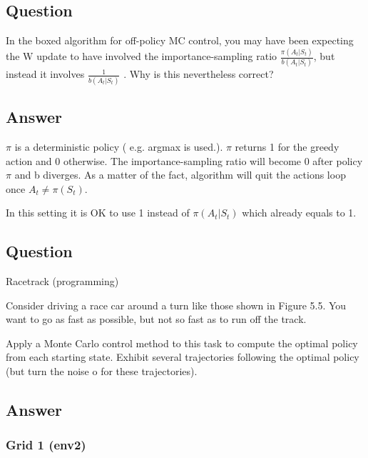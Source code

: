 \documentclass[11pt]{article}
\begin{document}
    \subsection{Question}

    In the boxed algorithm for off-policy MC control, you may have been expecting the W update to have involved the importance-sampling ratio $ \frac{\pi(A_t|S_t)}{b(A_t|S_t)} $, but instead it involves $ \frac{ 1 }{b(A_t|S_t)} $ .
    Why is this nevertheless correct?

    \subsection*{Answer}

    $\pi$ is a deterministic policy ( e.g. argmax is used.).
    $ \pi $ returns 1 for the greedy action and 0 otherwise.
    The importance-sampling ratio will become 0 after policy $\pi$ and b diverges.
    As a matter of the fact, algorithm will quit the actions loop once $ A_t \neq \pi(S_t)$.

    In this setting it is OK to use 1 instead of $\pi(A_t|S_t)$ which already equals to 1.

    \subsection{Question}

    Racetrack (programming)

    Consider driving a race car around a turn like those shown in Figure 5.5. You want to go as fast as possible, but not so fast as to run off the track.

    Apply a Monte Carlo control method to this task to compute the optimal policy from each starting state.
    Exhibit several trajectories following the optimal policy (but turn the noise o for these trajectories).

    \subsection*{Answer}

    \subsubsection*{Grid 1 (env2)}
\end{document}
